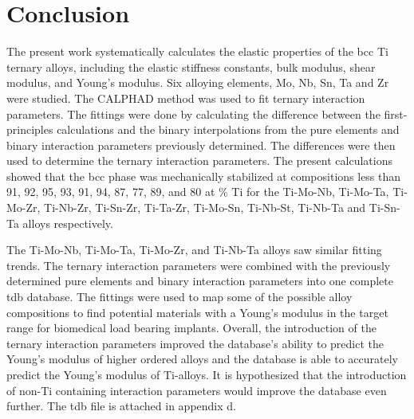 \section{Conclusion}

The present work systematically calculates the elastic properties of the bcc Ti ternary alloys, including the elastic stiffness constants, bulk modulus, shear modulus, and Young's modulus. Six alloying elements, Mo, Nb, Sn, Ta and Zr were studied. The CALPHAD method was used to fit ternary interaction parameters. The fittings were done by calculating the difference between the first-principles calculations and the binary interpolations from the pure elements and binary interaction parameters previously determined. The differences were then used to determine the ternary interaction parameters. The present calculations showed that the bcc phase was mechanically stabilized at compositions less than 91, 92, 95, 93, 91, 94, 87, 77, 89, and 80 at \% Ti for the Ti-Mo-Nb, Ti-Mo-Ta, Ti-Mo-Zr, Ti-Nb-Zr, Ti-Sn-Zr, Ti-Ta-Zr, Ti-Mo-Sn, Ti-Nb-St, Ti-Nb-Ta and Ti-Sn-Ta alloys respectively. 

The Ti-Mo-Nb, Ti-Mo-Ta, Ti-Mo-Zr, and Ti-Nb-Ta alloys saw similar fitting trends. The ternary interaction parameters were combined with the previously determined pure elements and binary interaction parameters into one complete tdb database. The fittings were used to map some of the possible alloy compositions to find potential materials with a Young's modulus in the target range for biomedical load bearing implants. Overall, the introduction of the ternary interaction parameters improved the database’s ability to predict the Young's modulus of higher ordered alloys and the database is able to accurately predict the Young's modulus of Ti-alloys. It is hypothesized that the introduction of non-Ti containing interaction parameters would improve the database even further. The tdb file is attached in appendix d. 


